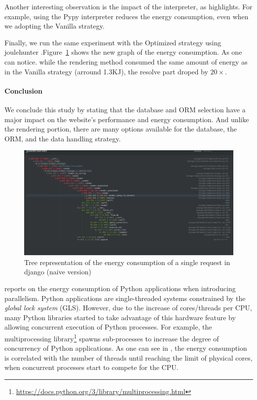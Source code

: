 Another interesting observation is the impact of the interpreter, as  highlights.
For example, using the \textsf{Pypy} interpreter reduces the energy consumption, even when we adopting the \textsf{Vanilla} strategy.

Finally, we run the same experiment with the \textsf{Optimized} strategy
using joulehunter
.Figure~\ref{fig:django_profiled_optimized} shows the new graph of the energy consumption. As one can notice. while the rendering method consumed the same amount of energy as in  the \textsf{Vanilla} strategy (arround 1.3KJ), the resolve part droped by $20\times$.

\paragraph{Conclusion}
We conclude this study by stating that the database and ORM selection have a major impact on the website's performance and energy consumption.
And unlike the rendering portion, there are many options available for the database, the ORM, and the data handling strategy.
\begin{figure}[hbt]
    \centering
    \includegraphics[width=\linewidth]{imgs/django_profiled_optimized}
    \caption{Tree representation of the energy consumption of a single request in django (naive version)}
    \label{fig:django_profiled_optimized}
\end{figure}



 reports on the energy consumption of Python applications when introducing parallelism.
Python applications are single-threaded systems constrained by the \emph{global lock system} (GLS).
However, due to the increase of cores/threads per CPU, many Python libraries started to take advantage of this hardware feature by allowing concurrent execution of Python processes.
For example, the multiprocessing library\footnote{\url{https://docs.python.org/3/library/multiprocessing.html}} spawns sub-processes to increase the degree of concurrency of Python applications.
As one can see in , the energy consumption is correlated with the number of threads until reaching the limit of physical cores, when concurrent processes start to compete for the CPU.


